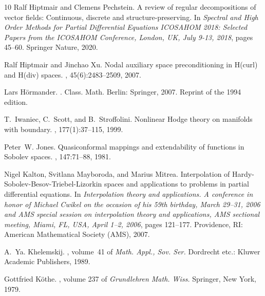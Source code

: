 \documentclass[10pt,a4paper]{amsart}
\theoremstyle{definition}
\theoremstyle{remark}
\numberwithin{equation}{section}
\begin{document}
\begin{thebibliography}{10}
Ralf Hiptmair and Clemens Pechstein.
\newblock A review of regular decompositions of vector fields: Continuous,
  discrete and structure-preserving.
\newblock In {\em Spectral and High Order Methods for Partial Differential
  Equations ICOSAHOM 2018: Selected Papers from the ICOSAHOM Conference,
  London, UK, July 9-13, 2018}, pages 45--60. Springer Nature, 2020.

Ralf Hiptmair and Jinchao Xu.
\newblock Nodal auxiliary space preconditioning in {H}(curl) and {H}(div)
  spaces.
, 45(6):2483--2509, 2007.

Lars H{\"o}rmander.
.
\newblock Class. Math. Berlin: Springer, 2007.
\newblock Reprint of the 1994 edition.

T.~Iwaniec, C.~Scott, and B.~Stroffolini.
\newblock Nonlinear {H}odge theory on manifolds with boundary.
, 177(1):37--115, 1999.

Peter~W. Jones.
\newblock Quasiconformal mappings and extendability of functions in {Sobolev}
  spaces.
, 147:71--88, 1981.

Nigel Kalton, Svitlana Mayboroda, and Marius Mitrea.
\newblock Interpolation of {Hardy}-{Sobolev}-{Besov}-{Triebel}-{Lizorkin}
  spaces and applications to problems in partial differential equations.
\newblock In {\em Interpolation theory and applications. A conference in honor
  of Michael Cwikel on the occasion of his 59th birthday, March 29--31, 2006
  and AMS special session on interpolation theory and applications, AMS
  sectional meeting, Miami, FL, USA, April 1--2, 2006}, pages 121--177.
  Providence, RI: American Mathematical Society (AMS), 2007.

A.~Ya. Khelemskij.
, volume~41 of {\em Math. Appl., Sov.
  Ser.}
\newblock Dordrecht etc.: Kluwer Academic Publishers, 1989.

Gottfried K{\"o}the.
, volume 237 of {\em Grundlehren
  Math. Wiss.}
\newblock Springer, New York, 1979.


\end{thebibliography}
\end{document}
